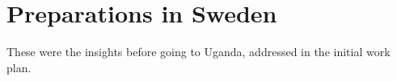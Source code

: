 \section{Preparations in Sweden}

These were the insights before going to Uganda, addressed in the initial work plan.
